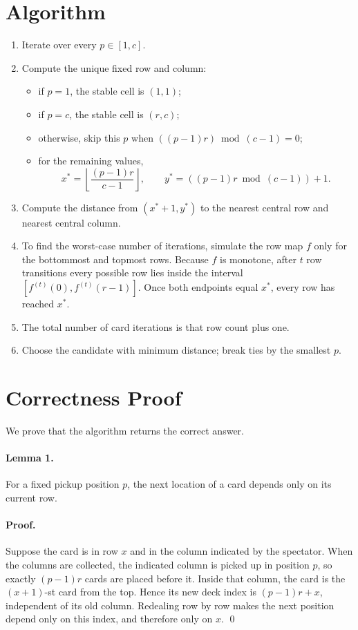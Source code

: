 \documentclass[11pt]{article}
\begin{document}
\section*{Algorithm}

\begin{enumerate}[leftmargin=*]
    \item Iterate over every $p \in [1, c]$.
    \item Compute the unique fixed row and column:
    \begin{itemize}[leftmargin=*]
        \item if $p=1$, the stable cell is $(1,1)$;
        \item if $p=c$, the stable cell is $(r,c)$;
        \item otherwise, skip this $p$ when $((p-1)r) \bmod (c-1)=0$;
        \item for the remaining values,
        \[
            x^* = \left\lfloor \frac{(p-1)r}{c-1} \right\rfloor,\qquad
            y^* = ((p-1)r \bmod (c-1)) + 1.
        \]
    \end{itemize}
    \item Compute the distance from $(x^*+1,y^*)$ to the nearest central row and nearest central column.
    \item To find the worst-case number of iterations, simulate the row map $f$ only for the bottommost
    and topmost rows. Because $f$ is monotone, after $t$ row transitions every possible row lies inside
    the interval $[f^{(t)}(0), f^{(t)}(r-1)]$. Once both endpoints equal $x^*$, every row has reached $x^*$.
    \item The total number of card iterations is that row count plus one.
    \item Choose the candidate with minimum distance; break ties by the smallest $p$.
\end{enumerate}

\section*{Correctness Proof}

We prove that the algorithm returns the correct answer.

\paragraph{Lemma 1.}
For a fixed pickup position $p$, the next location of a card depends only on its current row.

\paragraph{Proof.}
Suppose the card is in row $x$ and in the column indicated by the spectator.
When the columns are collected, the indicated column is picked up in position $p$, so exactly $(p-1)r$
cards are placed before it. Inside that column, the card is the $(x+1)$-st card from the top.
Hence its new deck index is $(p-1)r + x$, independent of its old column. Redealing row by row makes the
next position depend only on this index, and therefore only on $x$. \qed
\end{document}
